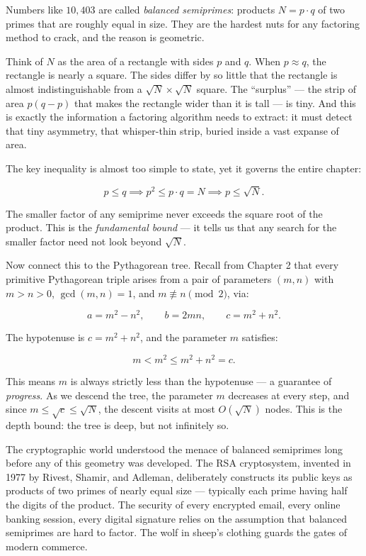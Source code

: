 Numbers like \(10{,}403\) are called \emph{balanced semiprimes}: products \(N = p \cdot q\) of two primes that are roughly equal in size. They are the hardest nuts for any factoring method to crack, and the reason is geometric.

Think of \(N\) as the area of a rectangle with sides \(p\) and \(q\). When \(p \approx q\), the rectangle is nearly a square. The sides differ by so little that the rectangle is almost indistinguishable from a \(\sqrt{N} \times \sqrt{N}\) square. The ``surplus'' --- the strip of area \(p(q - p)\) that makes the rectangle wider than it is tall --- is tiny. And this is exactly the information a factoring algorithm needs to extract: it must detect that tiny asymmetry, that whisper-thin strip, buried inside a vast expanse of area.

The key inequality is almost too simple to state, yet it governs the entire chapter:

\[p \le q \implies p^2 \le p \cdot q = N \implies p \le \sqrt{N}.\]

The smaller factor of any semiprime never exceeds the square root of the product. This is the \emph{fundamental bound} --- it tells us that any search for the smaller factor need not look beyond \(\sqrt{N}\).

Now connect this to the Pythagorean tree. Recall from Chapter 2 that every primitive Pythagorean triple arises from a pair of parameters \((m, n)\) with \(m > n > 0\), \(\gcd(m, n) = 1\), and \(m \not\equiv n \pmod{2}\), via:

\[a = m^2 - n^2, \qquad b = 2mn, \qquad c = m^2 + n^2.\]

The hypotenuse is \(c = m^2 + n^2\), and the parameter \(m\) satisfies:

\[m < m^2 \le m^2 + n^2 = c.\]

This means \(m\) is always strictly less than the hypotenuse --- a guarantee of \emph{progress}. As we descend the tree, the parameter \(m\) decreases at every step, and since \(m \le \sqrt{c} \le \sqrt{N}\), the descent visits at most \(O(\sqrt{N})\) nodes. This is the depth bound: the tree is deep, but not infinitely so.

The cryptographic world understood the menace of balanced semiprimes long before any of this geometry was developed. The RSA cryptosystem, invented in 1977 by Rivest, Shamir, and Adleman, deliberately constructs its public keys as products of two primes of nearly equal size --- typically each prime having half the digits of the product. The security of every encrypted email, every online banking session, every digital signature relies on the assumption that balanced semiprimes are hard to factor. The wolf in sheep's clothing guards the gates of modern commerce.



